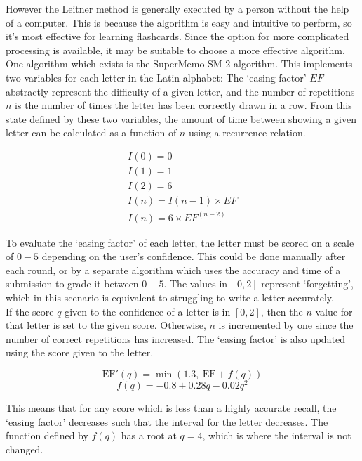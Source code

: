 \documentclass{article}
\begin{document}
However the Leitner method is generally executed by a person without the help of a computer. This is because the algorithm is easy and intuitive to perform, so it's most effective for learning flashcards. Since the option for more complicated processing is available, it may be suitable to choose a more effective algorithm. One algorithm which exists is the SuperMemo SM-2 algorithm. This implements two variables for each letter in the Latin alphabet: The `easing factor' \(EF\) abstractly represent the difficulty of a given letter, and the number of repetitions \(n\) is the number of times the letter has been correctly drawn in a row. From this state defined by these two variables, the amount of time between showing a given letter can be calculated as a function of \(n\) using a recurrence relation.

\begin{gather*}
    I(0)=0 \\
    I(1)=1 \\
    I(2)=6 \\
    I(n)=I(n-1)\times EF \\
    I(n)=6\times EF^{(n-2)}
\end{gather*}

To evaluate the `easing factor' of each letter, the letter must be scored on a scale of \(0-5\) depending on the user's confidence. This could be done manually after each round, or by a separate algorithm which uses the accuracy and time of a submission to grade it between \(0-5\). The values in \([0,2]\) represent `forgetting', which in this scenario is equivalent to struggling to write a letter accurately. \\

If the score \(q\) given to the confidence of a letter is in \([0,2]\), then the \(n\) value for that letter is set to the given score. Otherwise, \(n\) is incremented by one since the number of correct repetitions has increased. The `easing factor' is also updated using the score given to the letter.

\begin{equation*}
    \text{EF}'(q) = \min(1.3,\ \text{EF}+f(q))
\end{equation*}
\begin{equation*}
    f(q)=-0.8+0.28q-0.02q^2
\end{equation*}

This means that for any score which is less than a highly accurate recall, the `easing factor' decreases such that the interval for the letter decreases. The function defined by \(f(q)\) has a root at \(q=4\), which is where the interval is not changed.
\end{document}
